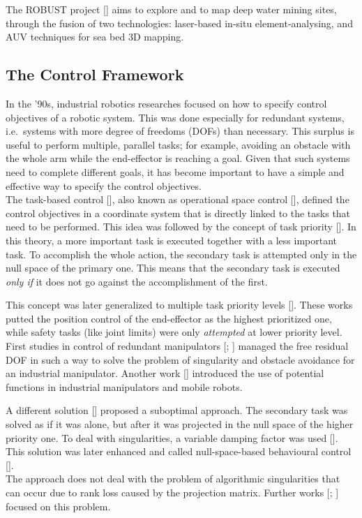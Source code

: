The ROBUST project [\cite{IntroRobust}] aims to explore and to map deep water mining sites, through the fusion of two technologies: laser-based in-situ element-analysing, and AUV techniques for sea bed 3D mapping.


\subsection{The Control Framework}
\label{subsec:ControlFramework}
In the '90s, industrial robotics researches focused on how to specify control objectives of a robotic system. This was done especially for redundant systems, i.e.\, systems with more degree of freedoms (DOFs) than necessary. This surplus is useful to perform multiple, parallel tasks; for example, avoiding an obstacle with the whole arm while the end-effector is reaching a goal. Given that such systems need to complete different goals, it has become important to have a simple and effective way to specify the control objectives.\\


The task-based control [\cite{IntroTpik1}], also known as operational space control [\cite{IntroTpik2}], defined the control objectives in a coordinate system that is directly linked to the tasks that need to be performed. This idea was followed by the concept of task priority [\cite{IntroTpik3}]. In this theory, a more important task is executed together with a less important task. To accomplish the whole action, the secondary task is attempted only in the null space of the primary one. This means that the secondary task is executed \textit{only if} it does not go against the accomplishment of the first.

This concept was later generalized to multiple task priority levels [\cite{IntroTpik4}]. These works putted the position control of the end-effector as the highest prioritized one, while safety tasks (like joint limits) were only \textit{attempted} at lower priority level.\\


First studies in control of redundant manipulators [\cite{IntroTpik6}; \cite{IntroTpik5}] managed the free residual DOF in such a way to solve the problem of singularity and obstacle avoidance for an industrial manipulator. Another work [\cite{IntroTpik7}] introduced the use of potential functions in industrial manipulators and mobile robots.

A different solution [\cite{IntroTpik8}] proposed a suboptimal approach. The secondary task was solved as if it was alone, but after it was projected in the null space of the higher priority one. To deal with singularities, a variable damping factor was used [\cite{IntroTpik1}]. This solution was later enhanced and called null-space-based behavioural control [\cite{IntroTpik9}].\\
The approach does not deal with the problem of algorithmic singularities that can occur due to rank loss caused by the projection matrix. Further works [\cite{IntroTpik11}; \cite{IntroTpik10}] focused on this problem.\\


